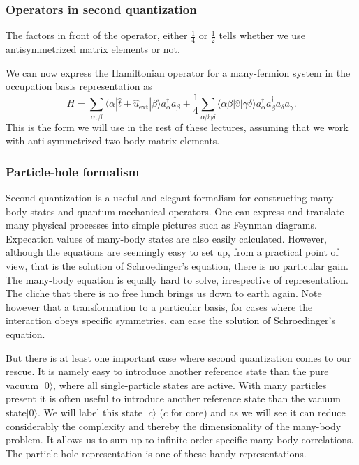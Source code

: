 \documentclass{beamer}
\begin{document}
\begin{frame}
\frametitle{Operators in second quantization}

\begin{block}{}
The factors in front of the operator, either  $\frac{1}{4}$ or 
$\frac{1}{2}$ tells whether we use antisymmetrized matrix elements or not. 

We can now express the Hamiltonian operator for a many-fermion system  in the occupation basis representation
as  
\begin{equation}
	H = \sum_{\alpha, \beta} \langle \alpha|\hat{t}+\hat{u}_{\mathrm{ext}}|\beta\rangle a_\alpha^{\dagger} a_\beta + \frac{1}{4} \sum_{\alpha\beta\gamma\delta}
		\langle \alpha \beta|\hat{v}|\gamma \delta\rangle a_\alpha^{\dagger} a_\beta^{\dagger} a_\delta a_\gamma. \label{eq:2-46b}
\end{equation}
This is the form we will use in the rest of these lectures, assuming that we work with anti-symmetrized two-body matrix elements.
\end{block}
\end{frame}

\begin{frame}
\frametitle{Particle-hole formalism}

\begin{block}{}
Second quantization is a useful and elegant formalism  for constructing many-body  states and 
quantum mechanical operators. One can express and translate many physical processes
into simple pictures such as Feynman diagrams. Expecation values of many-body states are also easily calculated.
However, although the equations are seemingly easy to set up, from  a practical point of view, that is
the solution of Schroedinger's equation, there is no particular gain.
The many-body equation is equally hard to solve, irrespective of representation. 
The cliche that 
there is no free lunch brings us down to earth again.  
Note however that a transformation to a particular
basis, for cases where the interaction obeys specific symmetries, can ease the solution of Schroedinger's equation. 

But there is at least one important case where second quantization comes to our rescue.
It is namely easy to introduce another reference state than the pure vacuum $|0\rangle $, where all single-particle states are active.
With many particles present it is often useful to introduce another reference state  than the vacuum state$|0\rangle $. We will label this state $|c\rangle$ ($c$ for core) and as we will see it can reduce 
considerably the complexity and thereby the dimensionality of the many-body problem. It allows us to sum up to infinite order specific many-body correlations.  The particle-hole representation is one of these handy representations. 
\end{block}
\end{frame}
\end{document}
